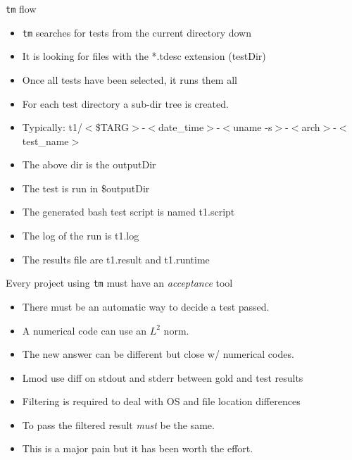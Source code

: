 \documentclass{beamer}
\begin{document}
\begin{frame}{\texttt{tm} flow}
  \begin{itemize}
    \item \texttt{tm} searches for tests from the current directory
      down
    \item It is looking for files with the *.tdesc extension (testDir)
    \item Once all tests have been selected, it runs them all
    \item For each test directory a sub-dir tree is created.
    \item Typically: t1/$<$\$TARG$>$-$<$date\_time$>$-$<$uname
      -s$>$-$<$arch$>$-$<$test\_name$>$
    \item The above dir is the outputDir
    \item The test is run in \$outputDir
    \item The generated bash test script is named {\color{blue} t1.script}
    \item The log of the run is {\color{blue} t1.log}
    \item The results file are {\color{blue} t1.result} and {\color{blue} t1.runtime}
  \end{itemize}
\end{frame}

\begin{frame}{Every project using \texttt{tm} must have an \emph{acceptance} tool}
  \begin{itemize}
    \item There must be an automatic way to decide a test passed.
    \item A numerical code can use an $L^2$ norm. 
    \item The new answer can be different but close w/ numerical codes.
    \item Lmod use diff on stdout and stderr between gold and test
      results
    \item Filtering is required to deal with OS and file location
      differences
    \item To pass the filtered result {\color{blue} \emph{must}} be
      the same.
    \item This is a major pain but it has been worth the effort.
  \end{itemize}
\end{frame}
\end{document}
